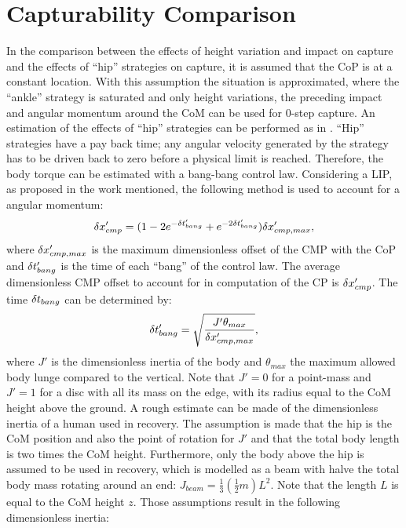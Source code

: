 \section{Capturability Comparison}
In the comparison between the effects of height variation and impact on capture and the effects of ``hip'' strategies on capture, it is assumed that the \ac{CoP} is at a constant location. With this assumption the situation is approximated, where the ``ankle'' strategy is saturated and only height variations, the preceding impact and angular momentum around the \ac{CoM} can be used for 0-step capture.
\paraskip
An estimation of the effects of ``hip'' strategies can be performed as in \cite{pratt2006capture, koolen2012capturability}. ``Hip'' strategies have a pay back time; any angular velocity generated by the strategy has to be driven back to zero before a physical limit is reached. Therefore, the body torque can be estimated with a bang-bang control law.  Considering a \ac{LIP}, as proposed in the work mentioned, the following method is used to account for a angular momentum:
\begin{equation}
\delta x_{cmp}' = (1-2e^{-\delta t_{bang}'}+e^{-2\delta t_{bang}'})\delta x_{cmp,max}',
\end{equation}
where $\delta x_{cmp,max}'$ is the maximum dimensionless offset of the \ac{CMP} with the \ac{CoP} and $\delta t_{bang}'$ is the time of each ``bang'' of the control law. The average dimensionless \ac{CMP} offset to account for in computation of the \ac{CP} is $\delta x_{cmp}'$. The time $\delta t_{bang}$ can be determined by:
\begin{equation}
\delta t_{bang}' = \sqrt{\frac{J'\theta_{max}}{\delta x_{cmp,max}'}},
\end{equation}
where $J'$ is the dimensionless inertia of the body and $\theta_{max}$ the maximum allowed body lunge compared to the vertical. Note that $J'=0$ for a point-mass and $J'=1$ for a disc with all its mass on the edge, with its radius equal to the \ac{CoM} height above the ground. 
\paraskip
A rough estimate can be made of the dimensionless inertia of a human used in recovery. The assumption is made that the hip is the \ac{CoM} position and also the point of rotation for $J'$ and that the total body length is two times the \ac{CoM} height. Furthermore, only the body above the hip is assumed to be used in recovery, which is modelled as a beam with halve the total body mass rotating around an end: $J_{beam} = \frac{1}{3}(\frac{1}{2}m)L^2$. Note that the length $L$ is equal to the \ac{CoM} height $z$. Those assumptions result in the following dimensionless inertia:
